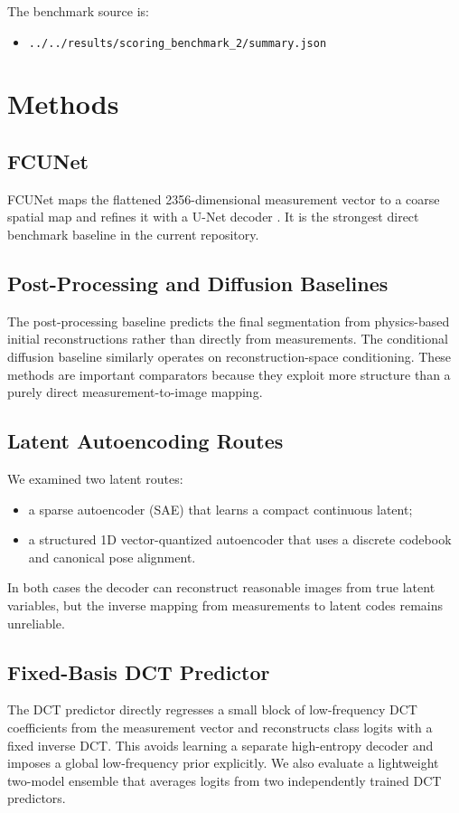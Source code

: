 \documentclass[11pt,a4paper]{article}
\begin{document}
The benchmark source is:
\begin{itemize}[leftmargin=1.5em]
    \item \texttt{../../results/scoring\_benchmark\_2/summary.json}
\end{itemize}

\section{Methods}
\subsection{FCUNet}
FCUNet maps the flattened 2356-dimensional measurement vector to a coarse spatial map and refines it with a U-Net decoder \cite{ronneberger2015unet}. It is the strongest direct benchmark baseline in the current repository.

\subsection{Post-Processing and Diffusion Baselines}
The post-processing baseline predicts the final segmentation from physics-based initial reconstructions rather than directly from measurements. The conditional diffusion baseline similarly operates on reconstruction-space conditioning. These methods are important comparators because they exploit more structure than a purely direct measurement-to-image mapping.

\subsection{Latent Autoencoding Routes}
We examined two latent routes:
\begin{itemize}[leftmargin=1.5em]
    \item a sparse autoencoder (SAE) that learns a compact continuous latent;
    \item a structured 1D vector-quantized autoencoder that uses a discrete codebook and canonical pose alignment.
\end{itemize}
In both cases the decoder can reconstruct reasonable images from true latent variables, but the inverse mapping from measurements to latent codes remains unreliable.

\subsection{Fixed-Basis DCT Predictor}
The DCT predictor directly regresses a small block of low-frequency DCT coefficients from the measurement vector and reconstructs class logits with a fixed inverse DCT. This avoids learning a separate high-entropy decoder and imposes a global low-frequency prior explicitly. We also evaluate a lightweight two-model ensemble that averages logits from two independently trained DCT predictors.
\end{document}
